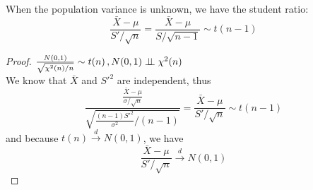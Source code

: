 \begin{itemize}
        When the population variance is unknown, we have the student ratio:
        \begin{equation*}
            \frac{\bar{X}-\mu}{S'/\sqrt{n}} = \frac{\bar{X}-\mu}{S/\sqrt{n-1}} \sim t(n-1)
        \end{equation*}
        \begin{proof}
            $\frac{N(0,1)}{\sqrt{\chi^2(n)/n}}\sim t(n)\, ,N(0,1)\perp\!\!\!\perp \chi^2(n)$\\
            We know that $\bar{X}$ and $S'^2$ are independent, thus
            \begin{equation*}
                \frac{\frac{\bar{X}-\mu}{\sigma/\sqrt{n}}}{\sqrt{\frac{(n-1)S'^2}{\sigma^2}/(n-1)}} = \frac{\bar{X}-\mu}{S'/\sqrt{n}} \sim t(n-1)
            \end{equation*}
            and because $t(n)\xrightarrow{d}N(0,1)$, we have
            \begin{equation*}
                \frac{\bar{X}-\mu}{S'/\sqrt{n}} \xrightarrow{d} N(0,1)
            \end{equation*}
        \end{proof}
\end{itemize}

